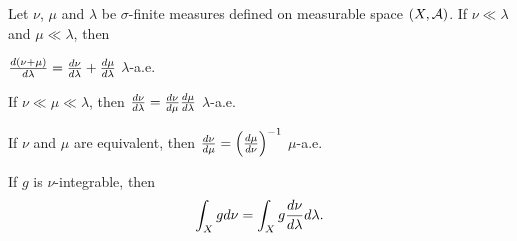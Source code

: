 \begin{proposition}\label{prop:r-n_derivative}
    Let $\nu$, $\mu$ and $\lambda$ be $\sigma$-finite measures defined 
    on measurable space $(X,\mathcal{A})$. If $\nu\ll\lambda$ and $\mu\ll\lambda$, 
    then 
    \begin{thmenum}
        \item $\frac{d{(\nu+\mu)}}{d{\lambda}} = \frac{d{\nu}}{d{\lambda}} + \frac{d{\mu}}{d{\lambda}}$ 
        $\lambda$-a.e.
        \item If $\nu\ll\mu\ll\lambda$, then $\frac{d{\nu}}{d{\lambda}} 
        = \frac{d{\nu}}{d{\mu}}\frac{d{\mu}}{d{\lambda}}$ $\lambda$-a.e. 
        \item If $\nu$ and $\mu$ are equivalent, then $\od{\nu}{\mu} 
        = \pth{\od{\mu}{\nu}}^{-1}$ $\mu$-a.e. 
        \item If $g$ is $\nu$-integrable, then 
        \begin{equation*}
            \int_X gd\nu = \int_X g\frac{d{\nu}}{d{\lambda}}d\lambda.
        \end{equation*}
    \end{thmenum}
\end{proposition}
